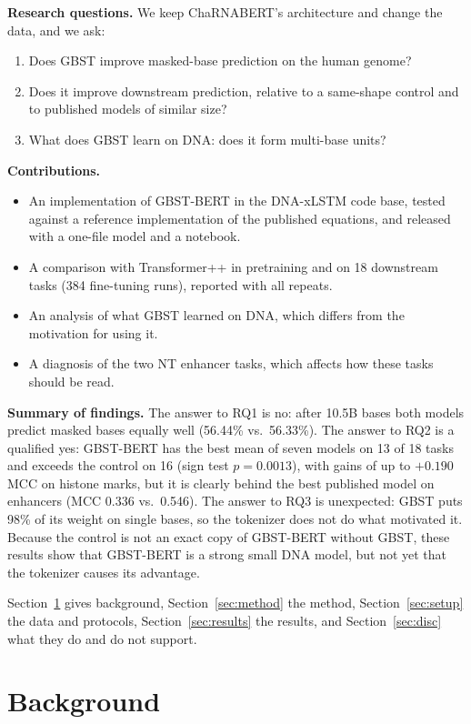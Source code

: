 \documentclass{article}
\begin{document}
\textbf{Research questions.} We keep ChaRNABERT's architecture and change the data, and we ask:
\begin{enumerate}
  \item[\textbf{RQ1.}] Does GBST improve masked-base prediction on the human genome?
  \item[\textbf{RQ2.}] Does it improve downstream prediction, relative to a same-shape control and to
  published models of similar size?
  \item[\textbf{RQ3.}] What does GBST learn on DNA: does it form multi-base units?
\end{enumerate}

\textbf{Contributions.}
\begin{itemize}
  \item An implementation of GBST-BERT in the DNA-xLSTM code base, tested against a reference
  implementation of the published equations, and released with a one-file model and a notebook.
  \item A comparison with Transformer++ in pretraining and on 18 downstream tasks (384 fine-tuning
  runs), reported with all repeats.
  \item An analysis of what GBST learned on DNA, which differs from the motivation for using it.
  \item A diagnosis of the two NT enhancer tasks, which affects how these tasks should be read.
\end{itemize}

\textbf{Summary of findings.} The answer to RQ1 is no: after 10.5B bases both models predict masked
bases equally well (56.44\% vs.\ 56.33\%). The answer to RQ2 is a qualified yes: GBST-BERT has the
best mean of seven models on 13 of 18 tasks and exceeds the control on 16 (sign test $p=0.0013$),
with gains of up to $+0.190$ MCC on histone marks, but it is clearly behind the best published model
on enhancers (MCC 0.336 vs.\ 0.546). The answer to RQ3 is unexpected: GBST puts 98\% of its weight
on single bases, so the tokenizer does not do what motivated it. Because the control is not an exact
copy of GBST-BERT without GBST, these results show that GBST-BERT is a strong small DNA model, but
not yet that the tokenizer causes its advantage.

Section~\ref{sec:background} gives background, Section~\ref{sec:method} the method,
Section~\ref{sec:setup} the data and protocols, Section~\ref{sec:results} the results, and
Section~\ref{sec:disc} what they do and do not support.

\section{Background}\label{sec:background}
\end{document}
